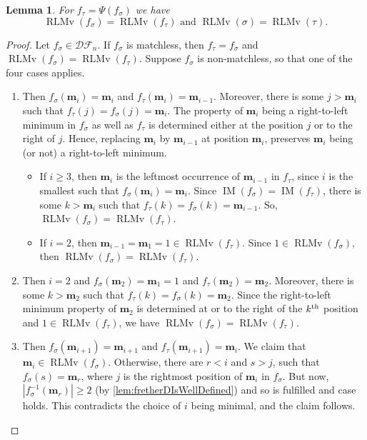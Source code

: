 \documentclass[reqno]{amsart}
\newtheorem{lemma}[theorem]{Lemma}
\theoremstyle{definition}
\newcommand{\thsup}{\textnormal{th}}
\newcommand{\DSEF}{\mathcal{DF}}%
\newcommand{\fretherD}{\Psi}
\newcommand{\img}{\mathbf{m}}
\DeclareMathOperator{\RLMv}{RLMv}
\DeclareMathOperator{\supp}{IM}
\begin{document}
 
\begin{lemma}\label{lem:rlmPreserving}
For $f_{\tau} = \fretherD(f_{\sigma})$ we have 
\begin{equation}\label{eq:ritoleft}
 \RLMv(f_{\sigma}) = \RLMv(f_{\tau}) \text{ and }
 \RLMv(\sigma) = \RLMv(\tau).
\end{equation}
\end{lemma}
\begin{proof}
Let $f_\sigma\in \DSEF_n$. 
If $f_\sigma$ is matchless, then $f_\tau=f_\sigma$ and  $\RLMv(f_\sigma)=\RLMv(f_\tau)$.
Suppose $f_\sigma$ is non-matchless, so that one of the four cases applies.

\begin{enumerate}[leftmargin=2cm]
 
	\item[\textbf{Case \caseOne[i]:}] 
	Then $f_\sigma(\img_i)=\img_i$ and 
	$f_\tau(\img_i)=\img_{i-1}$. 
	Moreover, there is some $j>\img_i$ such that $f_\tau(j)=f_\sigma(j)=\img_i$. 
	The property of $\img_i$ being a right-to-left minimum in $f_\sigma$
	as well as $f_\tau$ is determined either at the position $j$
	or to the right of $j$. Hence, replacing $\img_{i}$ by $\img_{i-1}$ at position
	$\img_i$, preserves $\img_i$
	being (or not) a right-to-left minimum.
	
	\begin{itemize}
		\item If $i\geq 3$, then $\img_i$ is the leftmost occurrence of $\img_{i-1}$ in $f_\tau$,
		since $i$ is the smallest such that $f_\sigma(\img_{i})=\img_i$.
		Since $\supp(f_\sigma)=\supp(f_\tau)$, there is some $k>\img_i$
		such that $f_\tau(k)=f_\sigma(k)=\img_{i-1}$.
		So, $\RLMv(f_\sigma)=\RLMv(f_\tau)$.
		
		\item If $i=2$, then $\img_{i-1}=\img_1=1\in\RLMv(f_\tau)$. Since $1\in \RLMv(f_\sigma)$, then $\RLMv(f_\sigma)=\RLMv(f_\tau)$.
	\end{itemize}
	
	\item[\textbf{Case \caseTwo[i]:}]
	Then $i=2$ and $f_\sigma(\img_2)=\img_1=1$
	and $f_\tau(\img_2)=\img_2$. 
	Moreover, there is some $k>\img_2$
	such that $f_\tau(k)=f_\sigma(k)=\img_2$.
	Since the right-to-left minimum property of $\img_2$
	is determined at or to the right of the $k^\thsup$
	position and $1\in \RLMv(f_\tau)$, we have $\RLMv(f_\sigma)=\RLMv(f_\tau)$.
	
	
	\item[\textbf{Case \caseThree[i]:}]
	Then $f_\sigma(\img_{i+1})=\img_{i+1}$
	and $f_\tau(\img_{i+1})=\img_{i}$.
	We claim that $\img_i\in\RLMv(f_\sigma)$.
	Otherwise, there are $r<i$ and $s>j$,
	such that $f_\sigma(s)=\img_r$, where $j$ is the rightmost position of $\img_i$ in $f_\sigma$.
	But now, $|f_\sigma^{-1}(\img_r)| \geq 2$ (by \cref{lem:fretherDIsWellDefined})
	and so \eqCond[r] is fulfilled and case \caseFour[r] holds.
	This contradicts the choice of $i$ being minimal, and the claim follows.
	

\end{enumerate}
\end{proof}
\end{document}
